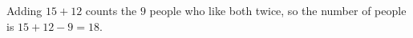 Adding $15+12$ counts the $9$ people who like both twice, so the number of people is $15+12-9=\boxed{18}$.
